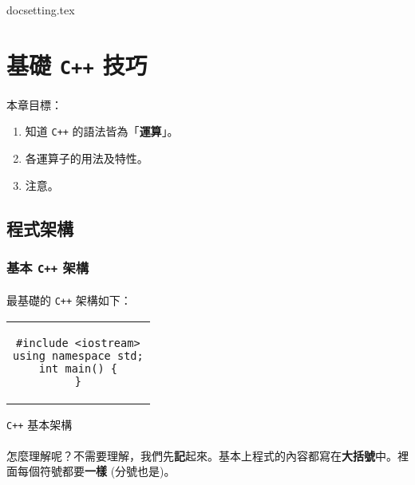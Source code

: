 \documentclass[12pt,a4paper,oneside]{article}
\begin{document}
\begin{CJK}{UTF8}{bkai}

{docsetting.tex}
\setcounter{section}{0}

\fi

\providecommand*\probpath{../uva.data/problem/store/}

\section{基礎 \texttt{C++} 技巧}

\paragraph{}本章目標：
\begin{enumerate}
\item 知道 \texttt{C++} 的語法皆為「\textbf{運算}」。
\item 各運算子的用法及特性。
\item 注意。
\end{enumerate}

\subsection{程式架構}
\subsubsection{基本 \texttt{C++} 架構}

\paragraph{}最基礎的 \texttt{C++} 架構如下：

\begin{code}[h!]
\centering
\begin{tabular}{c}
\begin{lstlisting}
#include <iostream>
using namespace std;
int main() {
}
\end{lstlisting}
\end{tabular}
\caption{\texttt{C++} 基本架構}
\label{basic:cpp:code:main}
\end{code}

\paragraph{}怎麼理解呢？不需要理解，我們先\textbf{記}起來。基本上程式的內容都寫在\textbf{大括號}中。裡面每個符號都要\textbf{一樣} (分號也是)。

\end{CJK}
\end{document}
